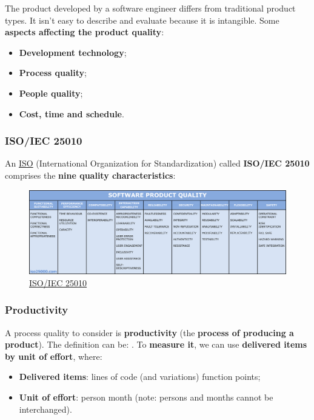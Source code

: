 The product developed by a software engineer differs from traditional product types. It isn't easy to describe and evaluate because it is intangible. Some \textbf{aspects affecting the product quality}:
\begin{itemize}
    \item \textbf{Development technology};
    \item \textbf{Process quality};
    \item \textbf{People quality};
    \item \textbf{Cost, time and schedule}.
\end{itemize}

\longline

\subsubsection{ISO/IEC 25010}

An \href{https://en.wikipedia.org/wiki/International_Organization_for_Standardization}{ISO} (International Organization for Standardization) called \textbf{ISO/IEC 25010} comprises the \textbf{nine quality characteristics}:
\begin{figure}[!htp]
    \centering
    \includegraphics[width=\textwidth]{img/iso_25010_en.png}
    \caption{\href{https://iso25000.com/index.php/en/iso-25000-standards/iso-25010}{ISO/IEC 25010}}
\end{figure}

\longline

\subsubsection{Productivity}

A process quality to consider is \textbf{productivity} (the \textbf{process of producing a product}). The definition can be: . To \textbf{measure it}, we can use \textbf{delivered items by unit of effort}, where:
\begin{itemize}
    \item \textbf{Delivered items}: lines of code (and variations) function points;
    \item \textbf{Unit of effort}: person month (note: persons and months cannot be interchanged).
\end{itemize}

